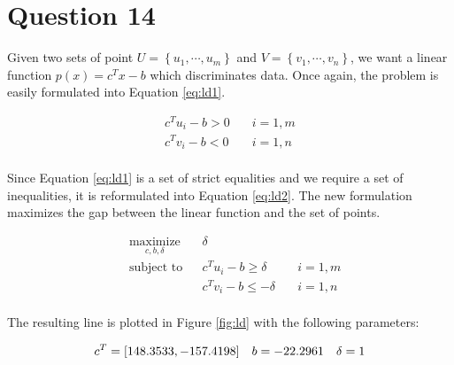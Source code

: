 \documentclass[letterpaper,12pt,]{article}
\begin{document}
\section*{Question 14}

Given two sets of point $U = \left\{u_1,\cdots,u_m\right\}$ and $V = \left\{v_1,\cdots,v_n\right\}$, we want a linear function $p(x) = c^T x -b$ which discriminates data. Once again, the problem is easily formulated into Equation \ref{eq:ld1}. 

\begin{equation}
\begin{aligned}
	 c^T u_i - b > 0 \quad & i=1,m\\
	 c^T v_i - b < 0 \quad & i=1,n\\
\end{aligned}
\label{eq:ld1}
\end{equation}

Since Equation \ref{eq:ld1} is a set of strict equalities and we require a set of inequalities, it is reformulated into Equation \ref{eq:ld2}. The new formulation maximizes the gap between the linear function and the set of points.

\begin{equation}
\begin{aligned}
& \underset{c,b,\delta}{\text{maximize}}
& & \delta \\
& \text{subject to}
& &	 c^T u_i - b \geq \delta \quad & i=1,m\\
&& &	 c^T v_i - b \leq -\delta \quad & i=1,n\\
\end{aligned}
\label{eq:ld2}
\end{equation}

The resulting line is plotted in Figure \ref{fig:ld} with the following parameters:

\begin{equation*}
c^T = [148.3533, -157.4198] \quad b =-22.2961 \quad \delta = 1\\
\label{eq:ld3}
\end{equation*}
\end{document}
